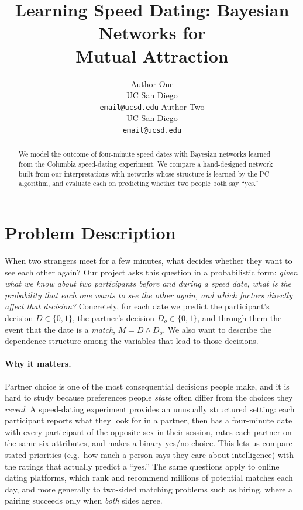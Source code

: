 \documentclass{article}
\title{Learning Speed Dating: Bayesian Networks for\\Mutual Attraction}
\author{%
  Author One \\ UC San Diego \\ \texttt{email@ucsd.edu} \And
  Author Two \\ UC San Diego \\ \texttt{email@ucsd.edu}
}
\begin{document}
\maketitle

\begin{abstract}
  We model the outcome of four-minute speed dates with Bayesian networks
  learned from the Columbia speed-dating experiment. We compare a
  hand-designed network built from our interpretations with networks
  whose structure is learned by the PC algorithm, and evaluate each on
  predicting whether two people both say ``yes.''
\end{abstract}

\section{Problem Description}
\label{sec:problem}

When two strangers meet for a few minutes, what decides whether they want to
see each other again? Our project asks this question in a probabilistic form:
\emph{given what we know about two participants before and during a speed date,
what is the probability that each one wants to see the other again, and which
factors directly affect that decision?} Concretely, for each date we predict the
participant's decision $D \in \{0,1\}$, the partner's decision
$D_o \in \{0,1\}$, and through them the event that the date is a
\emph{match}, $M = D \wedge D_o$. We also want to describe the dependence
structure among the variables that lead to those decisions.

\paragraph{Why it matters.}
Partner choice is one of the most consequential decisions people make, and it is
hard to study because preferences people \emph{state} often differ from the
choices they \emph{reveal}. A speed-dating experiment provides an unusually
structured setting: each participant reports what they look for in a partner,
then has a four-minute date with every participant of the opposite sex in their
session, rates each partner on the same six attributes, and makes a binary
yes/no choice. This lets us
compare stated priorities (e.g.\ how much a person says they care about
intelligence) with the ratings that actually predict a ``yes.'' The same
questions apply to online dating platforms, which rank and recommend millions of
potential matches each day, and more generally to two-sided matching problems
such as hiring, where a pairing succeeds only when \emph{both} sides agree.
\end{document}
